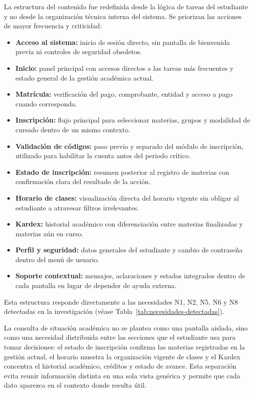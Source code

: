 La estructura del contenido fue redefinida desde la lógica de tareas del estudiante y no desde la organización técnica interna del sistema. Se priorizan las acciones de mayor frecuencia y criticidad:

\begin{itemize}
  \item \textbf{Acceso al sistema:} inicio de sesión directo, sin pantalla de bienvenida previa ni controles de seguridad obsoletos.
  \item \textbf{Inicio:} panel principal con accesos directos a las tareas más frecuentes y estado general de la gestión académica actual.
  \item \textbf{Matrícula:} verificación del pago, comprobante, entidad y acceso a pago cuando corresponda.
  \item \textbf{Inscripción:} flujo principal para seleccionar materias, grupos y modalidad de cursado dentro de un mismo contexto.
  \item \textbf{Validación de códigos:} paso previo y separado del módulo de inscripción, utilizado para habilitar la cuenta antes del periodo crítico.
  \item \textbf{Estado de inscripción:} resumen posterior al registro de materias con confirmación clara del resultado de la acción.
  \item \textbf{Horario de clases:} visualización directa del horario vigente sin obligar al estudiante a atravesar filtros irrelevantes.
  \item \textbf{Kardex:} historial académico con diferenciación entre materias finalizadas y materias aún en curso.
  \item \textbf{Perfil y seguridad:} datos generales del estudiante y cambio de contraseña dentro del menú de usuario.
  \item \textbf{Soporte contextual:} mensajes, aclaraciones y estados integrados dentro de cada pantalla en lugar de depender de ayuda externa.
\end{itemize}

Esta estructura responde directamente a las necesidades N1, N2, N5, N6 y N8 detectadas en la investigación (véase Tabla~\ref{tab:necesidades-detectadas}).

La consulta de situación académica no se plantea como una pantalla aislada, sino como una necesidad distribuida entre las secciones que el estudiante usa para tomar decisiones: el estado de inscripción confirma las materias registradas en la gestión actual, el horario muestra la organización vigente de clases y el Kardex concentra el historial académico, créditos y estado de avance. Esta separación evita reunir información distinta en una sola vista genérica y permite que cada dato aparezca en el contexto donde resulta útil.

